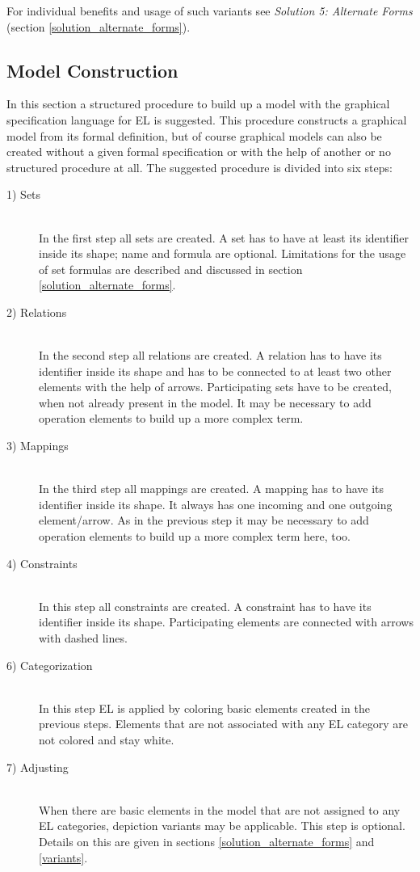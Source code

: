 \documentclass[twoside, openright, 12pt]{book}
\begin{document}
For individual benefits and usage of such variants see \textit{Solution 5: Alternate Forms} (section \ref{solution_alternate_forms}).



\subsection{Model Construction}
\label{gsl_construction}
In this section a structured procedure to build up a model with the graphical specification language for EL is suggested.
This procedure constructs a graphical model from its formal definition, but of course graphical models can also be created without a given formal specification or with the help of another or no structured procedure at all.
The suggested procedure is divided into six steps:

\begin{description}
\item[1) Sets]\hfill \\
In the first step all sets are created.
A set has to have at least its identifier inside its shape; name and formula are optional.
Limitations for the usage of set formulas are described and discussed in section \ref{solution_alternate_forms}.

\item[2) Relations]\hfill \\
In the second step all relations are created.
A relation has to have its identifier inside its shape and has to be connected to at least two other elements with the help of arrows.
Participating sets have to be created, when not already present in the model.
It may be necessary to add operation elements to build up a more complex term.

\item[3) Mappings]\hfill \\
In the third step all mappings are created.
A mapping has to have its identifier inside its shape.
It always has one incoming and one outgoing element/arrow.
As in the previous step it may be necessary to add operation elements to build up a more complex term here, too.

\item[4) Constraints]\hfill \\
In this step all constraints are created.
A constraint has to have its identifier inside its shape.
Participating elements are connected with arrows with dashed lines.

\item[6) Categorization]\hfill \\
In this step EL is applied by coloring basic elements created in the previous steps.
Elements that are not associated with any EL category are not colored and stay white.

\item[7) Adjusting]\hfill \\
When there are basic elements in the model that are not assigned to any EL categories, depiction variants may be applicable.
This step is optional.
Details on this are given in sections \ref{solution_alternate_forms} and \ref{variants}.
\end{description}
\end{document}
